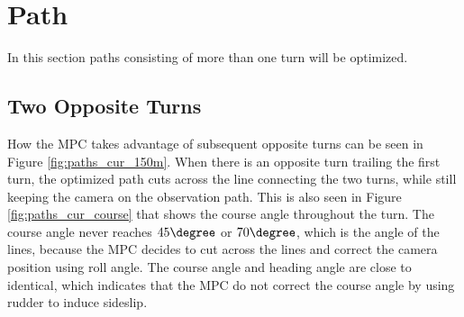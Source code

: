 \section{Path}

In this section paths consisting of more than one turn will be optimized.


\subsection{Two Opposite Turns}

How the MPC takes advantage of subsequent opposite turns can be seen in Figure \ref{fig:paths_cur_150m}. When there is an opposite turn trailing the first turn, the optimized path cuts across the line connecting the two turns, while still keeping the camera on the observation path. This is also seen in Figure \ref{fig:paths_cur_course} that shows the course angle throughout the turn. The course angle never reaches $45\degree$ or $70\degree$, which is the angle of the lines, because the MPC decides to cut across the lines and correct the camera position using roll angle. The course angle and heading angle are close to identical, which indicates that the MPC do not correct the course angle by using rudder to induce sideslip.

